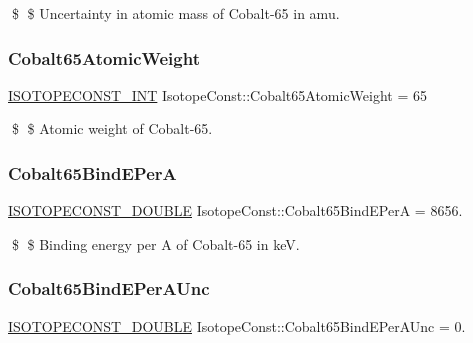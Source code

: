 \$ \$ Uncertainty in atomic mass of Cobalt-\/65 in amu. \mbox{\label{group___isotope_const-_cobalt-_co65_gadb091b31d26ff73b1e4c1a6f5d030d29}} 
\subsubsection{\texorpdfstring{Cobalt65\+Atomic\+Weight}{Cobalt65AtomicWeight}}
{\footnotesize\ttfamily \mbox{\hyperlink{group___isotope_const-_macros_ga5f18360b3e99483a35c32d789e62621c}{I\+S\+O\+T\+O\+P\+E\+C\+O\+N\+S\+T\+\_\+\+I\+NT}} Isotope\+Const\+::\+Cobalt65\+Atomic\+Weight = 65}

\$ \$ Atomic weight of Cobalt-\/65. \mbox{\label{group___isotope_const-_cobalt-_co65_ga16347c37de7701f1aad9dfd3f95b858e}} 
\subsubsection{\texorpdfstring{Cobalt65\+Bind\+E\+PerA}{Cobalt65BindEPerA}}
{\footnotesize\ttfamily \mbox{\hyperlink{group___isotope_const-_macros_ga8f45a7272ce02c0b4c65c44636ed719a}{I\+S\+O\+T\+O\+P\+E\+C\+O\+N\+S\+T\+\_\+\+D\+O\+U\+B\+LE}} Isotope\+Const\+::\+Cobalt65\+Bind\+E\+PerA = 8656.}

\$ \$ Binding energy per A of Cobalt-\/65 in keV. \mbox{\label{group___isotope_const-_cobalt-_co65_ga3001460cc83284d80f84b438b0aeabdd}} 
\subsubsection{\texorpdfstring{Cobalt65\+Bind\+E\+Per\+A\+Unc}{Cobalt65BindEPerAUnc}}
{\footnotesize\ttfamily \mbox{\hyperlink{group___isotope_const-_macros_ga8f45a7272ce02c0b4c65c44636ed719a}{I\+S\+O\+T\+O\+P\+E\+C\+O\+N\+S\+T\+\_\+\+D\+O\+U\+B\+LE}} Isotope\+Const\+::\+Cobalt65\+Bind\+E\+Per\+A\+Unc = 0.}

